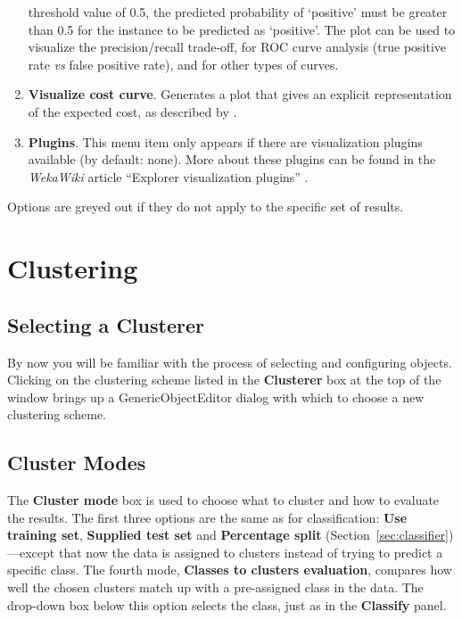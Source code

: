 \documentclass[a4paper]{article}
\begin{document}
\begin{enumerate}
threshold value of 0.5, the predicted probability of `positive' must be greater
than 0.5 for the instance to be predicted as `positive'. The plot can be used
to visualize the precision/recall trade-off, for ROC curve analysis (true
positive rate {\em vs} false positive rate), and for other types of curves. 
\item \textbf{Visualize cost curve}.
Generates a plot that gives an explicit representation of the expected cost, as
described by \cite{drummond}.
\item \textbf{Plugins}.
This menu item only appears if there are visualization plugins
available (by default: none). More about these plugins can be found in the 
\textit{WekaWiki} article ``Explorer visualization plugins'' \cite{explorervisplugins}.
\end{enumerate}
\noindent
Options are greyed out if they do not apply to the specific set of results.

\newpage

\section{Clustering}

\begin{center}
\end{center}

\subsection{Selecting a Clusterer}

By now you will be familiar with the process of selecting and configuring
objects.  Clicking on the clustering scheme listed in the \textbf{Clusterer}
box at the top of the window brings up a GenericObjectEditor dialog with which
to choose a new clustering scheme.

\subsection{Cluster Modes}

The \textbf{Cluster mode} box is used to choose what to cluster and how to
evaluate the results. The first three options are the same as for
classification: \textbf{Use training set}, \textbf{Supplied test set} and
\textbf{Percentage split} (Section~\ref{sec:classifier})---except that now the
data is assigned to clusters instead of trying to predict a specific class.
The fourth mode, \textbf{Classes to clusters evaluation}, compares how well the
chosen clusters match up with a pre-assigned class in the data.  The drop-down
box below this option selects the class, just as in the \textbf{Classify}
panel.
\end{document}
